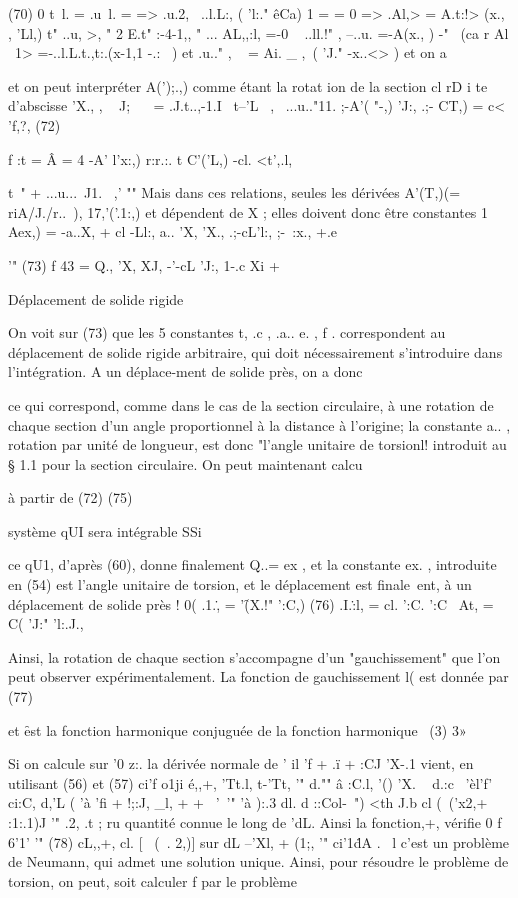 {(70) 0
t~l. = .u~l. = => .u.2,~ ..l.L:, ( 'l:." êCa)
1
{ 
= = 0 => .Al,> = A.t:!> (x., , 'Ll,)
t" ..u, >, " 
2 E.t" :-4-1,, " ... AL,,:l, =-0 ~ ..ll.!" , --..u. =-A(x., )
-"~ (ca r Al ~}1> =-..l.L.t.,t:.(x-1,1 -.: ~) et .u.." , ~ = Ai. _ ,~( 'J." -x..<> ) et on a 

et on peut interpréter A(');.,) comme étant la rotat ion de la section cl rD i te 
d'abscisse 
'X., 
, 
~
J; ~~ = .J.t..,-1.I~ t--'L~ ,~ ...u.."11. ;-A'( "-,) 'J:, .;-\) CT,) = c< 'f,?,
(72) 


f :t = Â 	= 4 -A' l'x:,) r:r.:. t C'('L,) -cl. <t',.l,

t~" + ...u...~J1.
~,' 
"" 
Mais dans ces relations, seules les dérivées A'(T,)(= riA/J./r..~), 17,'('.1:,) et dépendent de X ; elles doivent donc être constantes 
1 
Aex,) = -a..X, + cl 
-Ll:, a.. 'X, 'X., .;-cL'l:, ;-~:x., +.e

'" 
(73) 
f 43 = Q., 'X, XJ, 	-'-cL 'J:, 1-.c Xi + { 
Déplacement de solide rigide 

On voit sur (73) que les 5 constantes t, .c , .a.. e. , f . correspondent au déplacement de solide rigide arbitraire, qui doit nécessairement s'introduire dans l'intégration. A un déplace-ment de solide près, on a donc 


ce qui correspond, comme dans le cas de la section circulaire, à une rotation de chaque section d'un angle proportionnel à la distance à l'origine; la cons­tante a.. , rotation par unité de longueur, est donc "l'angle unitaire de tor­sionl! introduit au § 1.1 pour la section circulaire. On peut maintenant calcu­

à partir de (72) 
(75) 

système qUI sera intégrable SSi 


ce qU1, d'après (60), donne finalement Q..= ex , et la constante ex. , introduite en (54) est l'angle unitaire de torsion, et le déplacement est finale~ent, à un déplacement de solide près 
! 
0(
.1.\., = '\f (X.!" ':C,) 
(76) 
.I.\.:l, = cl. ':C. ':C~ 
At, = C( 'J:" 'l:.J., 

Ainsi, la rotation de chaque section s'accompagne d'un "gauchissement" que l'on peut observer expérimentalement. La fonction de gauchissement l( est donnée par 
(77) 


et \f est la fonction harmonique conjuguée de la fonction harmonique 
~(3) 3» 

Si 	on calcule sur '0 z:. la dérivée normale de \fl ' il
'f + 	.ï + :CJ
'X-.1 
vient, en utilisant (56) et (57) 
ci'f o1ji é,,+,
'Tt.l, t-'Tt,
'" 
d."" â :C.l, '() 'X. ~ d.:c~ 'èl'f' ci:C, d,'L
( 'à 'fi 	+ !;:J, _l,
+ 	+ ~'\
'" 	'à ):.3 dl. d ::Col-~") <th J.b cl (~('x2,+ :1:.1)J
'" .2, .t ;
ru 
quantité connue le long de 'dL. Ainsi la fonction,+, vérifie 
0
f 	6'1' '" 
(78) 	cL,,+, cl. [~ (~. 2,)] sur dL
--'Xl, + (1;,
'" 
ci'1\. dA .~
l 
c'est un problème de Neumann, qui admet une solution unique. Ainsi, pour résoudre le problème de torsion, on peut, soit calculer f par le problème 

}}
